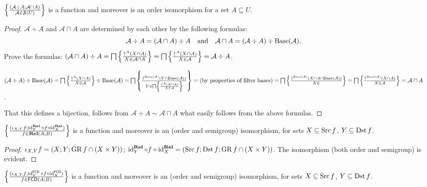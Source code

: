 \begin{prop}
  $\left\{ \frac{ (\mathcal{A} \div A ; \mathcal{A} \sqcap A) }{
  \mathcal{A} \in \mathfrak{F} (U) }\right\}$ is a function and
  moreover is an order isomorphism for a set $A \subseteq U$.
\end{prop}

\begin{proof}
  $\mathcal{A} \div A$ and $\mathcal{A} \sqcap A$ are determined by each other
  by the following formulas:
  \[ \mathcal{A} \div A = (\mathcal{A} \sqcap A) \div A \quad
     \text{and} \quad \mathcal{A} \sqcap A = (\mathcal{A} \div A) \div
     \operatorname{Base} (\mathcal{A}) . \]
  Prove the formulas: $(\mathcal{A} \sqcap A) \div A = \bigsqcap \left\{ \frac{
  \uparrow^A (X \cap A) }{ X \in \mathcal{A} \sqcap A
  }\right\} = \bigsqcap \left\{ \frac{ \uparrow^A (X \cap A) }{
  X \in \mathcal{A} }\right\} = \mathcal{A} \div A$.
  
  $(\mathcal{A} \div A) \div \operatorname{Base} (\mathcal{A}) = \bigsqcap \left\{ \frac{
  \uparrow^A (X \cap A) }{ X \in \mathcal{A} }\right\}
  \div \operatorname{Base} (\mathcal{A}) = \bigsqcap \left\{ \frac{ \uparrow^{\operatorname{Base}
  (\mathcal{A})} (Y \cap \operatorname{Base} (\mathcal{A})) }{
  Y \in \bigsqcap \left\{ \frac{ \uparrow^A (X \cap A) }{
  X \in \mathcal{A} }\right\} }\right\} = \text{(by properties of
  filter bases)} = \bigsqcap \left\{ \frac{ \uparrow^{\operatorname{Base} (\mathcal{A})} (X
  \cap A \cap \operatorname{Base} (\mathcal{A})) }{ X \in
  }\right\} = \bigsqcap \left\{ \frac{ \uparrow^{\operatorname{Base}
  (\mathcal{A})} (X \cap A) }{ X \in \mathcal{A}
  }\right\} = \mathcal{A} \sqcap A$.
  
  That this defines a bijection, follows from $\mathcal{A} \div A \sim
  \mathcal{A} \sqcap A$ what easily follows from the above formulas.
\end{proof}

\begin{prop}
  $\left\{ \frac{ (\iota_{X, Y} f ; \operatorname{id}^{\mathbf{Rel}}_Y \circ f \circ
  \operatorname{id}^{\mathbf{Rel}}_X) }{ f \in
  \mathbf{Rel} (A ; B) }\right\}$ is a function and moreover is an
  (order and semigroup) isomorphism, for sets $X \subseteq \operatorname{Src} f$, $Y
  \subseteq \operatorname{Dst} f$.
\end{prop}

\begin{proof}
  $\iota_{X, Y} f = (X ; Y ; \operatorname{GR} f \cap (X \times Y))$;
  $\operatorname{id}^{\mathbf{Rel}}_Y \circ f \circ
  \operatorname{id}^{\mathbf{Rel}}_X = (\operatorname{Src} f ; \operatorname{Dst} f ;
  \operatorname{GR} f \cap (X \times Y))$. The isomorphism (both order and semigroup)
  is evident.
\end{proof}

\begin{prop}
  $\left\{ \frac{ (\iota_{X, Y} f ; \operatorname{id}^{\mathsf{FCD}}_Y
  \circ f \circ \operatorname{id}^{\mathsf{FCD}}_X) }{
  f \in \mathsf{FCD} (A ; B) }\right\}$ is a function and moreover is an
  (order and semigroup) isomorphism, for sets $X \subseteq \operatorname{Src} f$, $Y
  \subseteq \operatorname{Dst} f$.
\end{prop}

